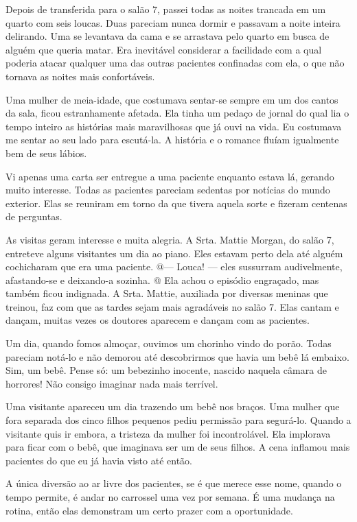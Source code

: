 Depois de transferida para o salão 7, passei todas as noites trancada em
um quarto com seis loucas. Duas pareciam nunca dormir e passavam a noite
inteira delirando. Uma se levantava da cama e se arrastava pelo quarto
em busca de alguém que queria matar. Era inevitável considerar a
facilidade com a qual poderia atacar qualquer uma das outras pacientes
confinadas com ela, o que não tornava as noites mais confortáveis.

Uma mulher de meia-idade, que costumava sentar-se sempre em um dos
cantos da sala, ficou estranhamente afetada. Ela tinha um pedaço de
jornal do qual lia o tempo inteiro as histórias mais maravilhosas que já
ouvi na vida. Eu costumava me sentar ao seu lado para escutá-la. A
história e o romance fluíam igualmente bem de seus lábios.

Vi apenas uma carta ser entregue a uma paciente enquanto estava lá,
gerando muito interesse. Todas as pacientes pareciam sedentas por
notícias do mundo exterior. Elas se reuniram em torno da que tivera
aquela sorte e fizeram centenas de perguntas.

As visitas geram interesse e muita alegria. A Srta. Mattie Morgan, do
salão 7, entreteve alguns visitantes um dia ao piano. Eles estavam perto
dela até alguém cochicharam que era uma paciente. @--- Louca! --- eles
sussurram audivelmente, afastando-se e deixando-a sozinha. @ Ela achou o
episódio engraçado, mas também ficou indignada. A Srta. Mattie,
auxiliada por diversas meninas que treinou, faz com que as tardes sejam
mais agradáveis no salão 7. Elas cantam e dançam, muitas vezes os
doutores aparecem e dançam com as pacientes.

Um dia, quando fomos almoçar, ouvimos um chorinho vindo do porão. Todas
pareciam notá-lo e não demorou até descobrirmos que havia um bebê lá
embaixo. Sim, um bebê. Pense só: um bebezinho inocente, nascido naquela
câmara de horrores! Não consigo imaginar nada mais terrível.

Uma visitante apareceu um dia trazendo um bebê nos braços. Uma mulher
que fora separada dos cinco filhos pequenos pediu permissão para
segurá-lo. Quando a visitante quis ir embora, a tristeza da mulher foi
incontrolável. Ela implorava para ficar com o bebê, que imaginava ser um
de seus filhos. A cena inflamou mais pacientes do que eu já havia visto
até então.

A única diversão ao ar livre dos pacientes, se é que merece esse nome,
quando o tempo permite, é andar no carrossel uma vez por semana. É uma
mudança na rotina, então elas demonstram um certo prazer com a
oportunidade.

